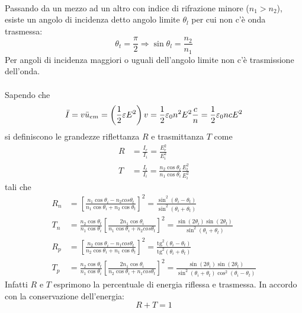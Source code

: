 \documentclass{article}
\begin{document}
\\
Passando da un mezzo ad un altro con indice di rifrazione minore ($n_1 > n_2$), esiste un angolo di incidenza detto angolo limite $\theta_l$ per cui non c’è onda trasmessa:
\begin{equation}
    \theta_t=\frac{\pi}{2} \Rightarrow \sin\theta_l=\frac{n_2}{n_1}
    \nonumber
\end{equation}
Per angoli di incidenza maggiori o uguali dell’angolo limite non c’è trasmissione dell’onda.\\
\\
Sapendo che 
\begin{equation}
    \bar{I}= v\Bar{u}_{em}= \left(\frac{1}{2}\varepsilon E^2\right)v = \frac{1}{2}\varepsilon_0 n^2E^2 \frac{c}{n} = \frac{1}{2}\varepsilon_0ncE^2
\nonumber  
\end{equation}
si definiscono le grandezze riflettanza $R$ e trasmittanza $T$ come
\begin{equation}
\begin{split}
     R &=\frac{I_r}{I_i}=\frac{E_r^2}{E_i^2} \\
     T &=\frac{I_t}{I_i}=\frac{n_2\cos\theta_t}{n_1\cos\theta_i} \frac{E_t^2}{E_i^2}
     \nonumber
\end{split} 
\end{equation}
tali che 
\begin{equation}
\begin{split}
     R_n &=\left[\frac{n_1\cos\theta_i - n_2cos\theta_t}{n_1\cos\theta_i + n_2\cos\theta_t}\right]^2 = \frac{\sin^2(\theta_i-\theta_t)}{\sin^2(\theta_i+\theta_t)} \\
     T_n &=\frac{n_2\cos\theta_t}{n_1\cos\theta_i} \left[\frac{2n_1\cos\theta_i}{n_1\cos\theta_i + n_2cos\theta_t}\right]^2 = \frac{\sin(2\theta_i) \sin(2\theta_t)}{\sin^2(\theta_i+\theta_t)} \\
     R_p &=\left[\frac{n_2\cos\theta_i - n_1cos\theta_t}{n_2\cos\theta_i + n_1\cos\theta_t}\right]^2 = \frac{\text{tg} ^2(\theta_i-\theta_t)}{\text{tg}^2(\theta_i+\theta_t)} \\
     T_p &=\frac{n_2\cos\theta_t}{n_1\cos\theta_i} \left[\frac{2n_1\cos\theta_i}{n_2\cos\theta_i + n_1cos\theta_t}\right]^2 = \frac{\sin(2\theta_i) \sin(2\theta_t)}{\sin^2(\theta_i+\theta_t) \cos^2(\theta_i-\theta_t)}
     \nonumber
\end{split} 
\end{equation}
Infatti $R$ e $T$ esprimono la percentuale di energia riflessa e trasmessa.
In accordo con la conservazione dell’energia:
\begin{equation}
    R+T=1
    \nonumber
\end{equation}
\end{document}
